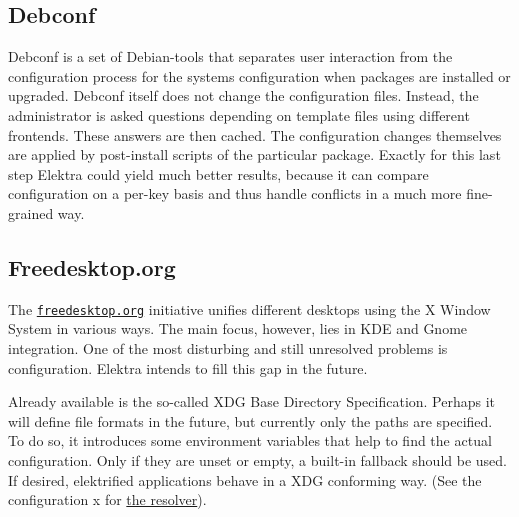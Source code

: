 \subsection*{Debconf}

Debconf is a set of Debian-\/tools that separates user interaction from the configuration process for the system\textquotesingle{}s configuration when packages are installed or upgraded. Debconf itself does not change the configuration files. Instead, the administrator is asked questions depending on template files using different frontends. These answers are then cached. The configuration changes themselves are applied by post-\/install scripts of the particular package. Exactly for this last step Elektra could yield much better results, because it can compare configuration on a per-\/key basis and thus handle conflicts in a much more fine-\/grained way.

\subsection*{Freedesktop.\+org}

The \href{https://freedesktop.org}{\tt freedesktop.\+org} initiative unifies different desktops using the X Window System in various ways. The main focus, however, lies in K\+DE and Gnome integration. One of the most disturbing and still unresolved problems is configuration. Elektra intends to fill this gap in the future.

Already available is the so-\/called X\+DG Base Directory Specification. Perhaps it will define file formats in the future, but currently only the paths are specified. To do so, it introduces some environment variables that help to find the actual configuration. Only if they are unset or empty, a built-\/in fallback should be used. If desired, elektrified applications behave in a X\+DG conforming way. (See the configuration x for \hyperlink{md_src_plugins_resolver_README_src_plugins_resolver_README_md}{the resolver}). 